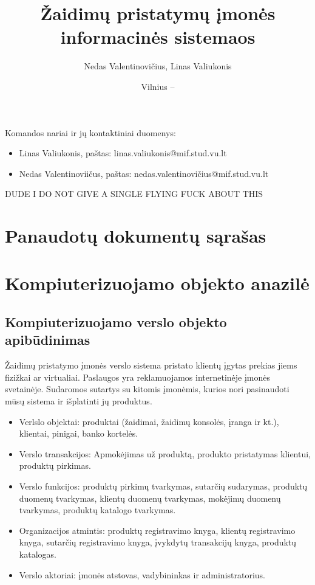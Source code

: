 \documentclass{VUMIFPSkursinis}
\title{Žaidimų pristatymų įmonės informacinės sistemaos}
\author{Nedas Valentinovičius, Linas Valiukonis}
\date{Vilnius – \the\year}
\begin{document}
	
\maketitle
\cleardoublepage{}
\setcounter{page}{2}

Komandos nariai ir jų kontaktiniai duomenys:
\begin{itemize}
	\item Linas Valiukonis, paštas: linas.valiukonis@mif.stud.vu.lt
	\item Nedas Valentinoviičus, paštas: nedas.valentinovičius@mif.stud.vu.lt
\end{itemize}

\tableofcontents

DUDE I DO NOT GIVE A SINGLE FLYING FUCK ABOUT THIS

\section{Panaudotų dokumentų sąrašas}



\newpage
\section{Kompiuterizuojamo objekto anazilė}

\newpage
\subsection{Kompiuterizuojamo verslo objekto apibūdinimas}
Žaidimų pristatymo įmonės verslo sistema pristato klientų įgytas prekias jiems fizižkai ar virtualiai. Paslaugos yra reklamuojamos internetinėje įmonės svetainėje. Sudaromos sutartys su kitomis įmonėmis, kurios nori pasinaudoti mūsų sistema ir išplatinti jų produktus.
\begin{itemize}
	\item Verlslo objektai: produktai (žaidimai, žaidimų konsolės, įranga ir kt.), klientai, pinigai, banko kortelės.
	\item Verslo transakcijos: Apmokėjimas už produktą, produkto pristatymas klientui, produktų pirkimas.
	\item Verslo funkcijos: produktų pirkimų tvarkymas, sutarčių sudarymas, produktų duomenų tvarkymas, klientų duomenų tvarkymas, mokėjimų duomenų tvarkymas, produktų katalogo tvarkymas.
	\item Organizacijos atmintis: produktų registravimo knyga, klientų registravimo knyga, sutarčių registravimo knyga, įvykdytų transakcijų knyga, produktų katalogas.
	\item Verslo aktoriai: įmonės atstovas, vadybininkas ir administratorius.
\end{itemize}
\newpage
\end{document}
